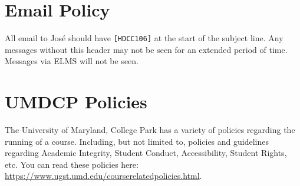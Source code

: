 \documentclass{article}
\begin{document}
\section{Email Policy}

All email to Jos\'{e} should have \verb`[HDCC106]` at the start of the subject line.
Any messages without this header may not be seen for an extended period of time.
Messages via ELMS will not be seen.


\section{UMDCP Policies}

The University of Maryland, College Park has a variety of policies regarding the running of a course.
Including, but not limited to, policies and guidelines regarding Academic Integrity, Student Conduct, Accessibility, Student Rights, etc.
You can read these policies here: \url{https://www.ugst.umd.edu/courserelatedpolicies.html}.
\end{document}
